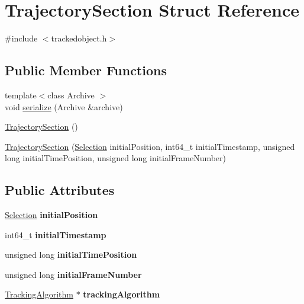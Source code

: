 \hypertarget{structTrajectorySection}{}\section{Trajectory\+Section Struct Reference}
\label{structTrajectorySection}


{\ttfamily \#include $<$trackedobject.\+h$>$}

\subsection*{Public Member Functions}
\begin{DoxyCompactItemize}
\item 
{\footnotesize template$<$class Archive $>$ }\\void \hyperlink{structTrajectorySection_aa8a375caa7bc865589e494b070411a73}{serialize} (Archive \&archive)
\item 
\hyperlink{structTrajectorySection_a8514a1d0f2d4416f76a605a9b22bdd56}{Trajectory\+Section} ()
\item 
\hyperlink{structTrajectorySection_ae8bfb8a667d501c6423c2cb24bf40412}{Trajectory\+Section} (\hyperlink{structSelection}{Selection} initial\+Position, int64\+\_\+t initial\+Timestamp, unsigned long initial\+Time\+Position, unsigned long initial\+Frame\+Number)
\end{DoxyCompactItemize}
\subsection*{Public Attributes}
\begin{DoxyCompactItemize}
\item 
\hypertarget{structTrajectorySection_ad07d60f8a921f5c77b19b8c6c8b3dd36}{}\hyperlink{structSelection}{Selection} {\bfseries initial\+Position}\label{structTrajectorySection_ad07d60f8a921f5c77b19b8c6c8b3dd36}

\item 
\hypertarget{structTrajectorySection_a2334c0ba542c815d0a22cd468eb2334e}{}int64\+\_\+t {\bfseries initial\+Timestamp}\label{structTrajectorySection_a2334c0ba542c815d0a22cd468eb2334e}

\item 
\hypertarget{structTrajectorySection_adeaa69f62cab9464d79df0c1cac2dd6e}{}unsigned long {\bfseries initial\+Time\+Position}\label{structTrajectorySection_adeaa69f62cab9464d79df0c1cac2dd6e}

\item 
\hypertarget{structTrajectorySection_a364acaf98a97000611bdcbb3deb3030f}{}unsigned long {\bfseries initial\+Frame\+Number}\label{structTrajectorySection_a364acaf98a97000611bdcbb3deb3030f}

\item 
\hypertarget{structTrajectorySection_a5c64979fad2b666bb13ae305a560ff54}{}\hyperlink{classTrackingAlgorithm}{Tracking\+Algorithm} $\ast$ {\bfseries tracking\+Algorithm}\label{structTrajectorySection_a5c64979fad2b666bb13ae305a560ff54}

\end{DoxyCompactItemize}


